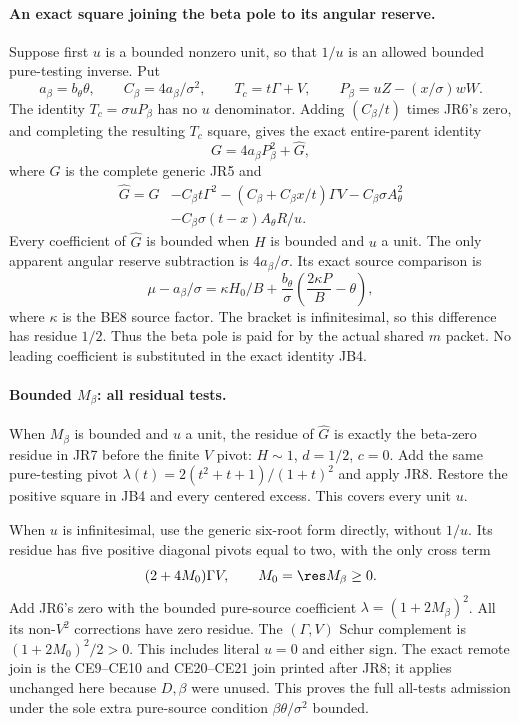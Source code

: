 \paragraph{An exact square joining the beta pole to its angular reserve.}
Suppose first $u$ is a bounded nonzero unit, so that $1/u$ is an
allowed bounded pure-testing inverse. Put
\[
 a_\beta=b_\theta\theta,\qquad
 C_\beta=4a_\beta/\sigma^2,\qquad T_c=t\Gamma+V,
 \qquad P_\beta=uZ-(x/\sigma)wW.
\]
The identity $T_c=\sigma uP_\beta$ has no $u$ denominator.
Adding $(C_\beta/t)$ times JR6's zero, and completing the resulting
$T_c$ square, gives the exact entire-parent identity
\[
 G=4a_\beta P_\beta^2+\widehat G,
\tag{JB4}
\]
where $G$ is the complete generic JR5 and
\begin{align*}
 \widehat G=G
 &-C_\beta t\Gamma^2
 -(C_\beta+C_\beta x/t)\Gamma V
 -C_\beta\sigma A_\theta^2\\
 &-C_\beta\sigma(t-x)A_\theta R/u.
\tag{JB5}
\end{align*}
Every coefficient of $\widehat G$ is bounded when $H$ is bounded
and $u$ a unit. The only apparent angular reserve subtraction is
$4a_\beta/\sigma$. Its exact source comparison is
\[
 \mu-a_\beta/\sigma
 =\kappa H_0/B+
    \frac{b_\theta}{\sigma}\left(\frac{2\kappa P}{B}-\theta\right),
\tag{JB6}
\]
where $\kappa$ is the BE8 source factor. The bracket is infinitesimal,
so this difference has residue $1/2$. Thus the beta pole is paid for
by the actual shared $m$ packet. No leading coefficient is substituted
in the exact identity JB4.

\paragraph{Bounded $M_\beta$: all residual tests.}
When $M_\beta$ is bounded and $u$ a unit, the residue of $\widehat G$
is exactly the beta-zero residue in JR7 before the finite $V$ pivot:
$H\sim1$, $d=1/2$, $c=0$. Add the same pure-testing pivot
$\lambda(t)=2(t^2+t+1)/(1+t)^2$ and apply JR8. Restore the positive
square in JB4 and every centered excess. This covers every unit $u$.

When $u$ is infinitesimal, use the generic six-root form directly,
without $1/u$. Its residue has five positive diagonal pivots equal to
two, with the only cross term
\[
 (2+4M_0)\Gamma V,\qquad M_0=\res M_\beta\ge0.
\]
Add JR6's zero with the bounded pure-source coefficient
$\lambda=(1+2M_\beta)^2$. All its non-$V^2$ corrections have zero
residue. The $(\Gamma,V)$ Schur complement is
$(1+2M_0)^2/2>0$. This includes literal $u=0$ and either sign.
The exact remote join is the CE9--CE10 and CE20--CE21 join printed
after JR8; it applies unchanged here because $D,\beta$ were unused.
This proves the full all-tests admission under the sole extra
pure-source condition $\beta\theta/\sigma^2$ bounded.

